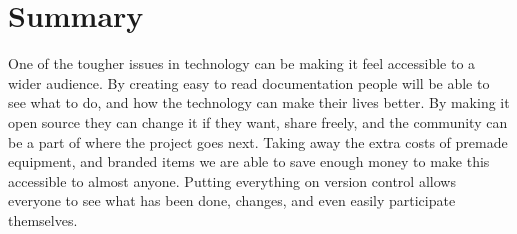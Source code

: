 \documentclass[12pt]{article}
\begin{document}
\section*{Summary}
One of the tougher issues in technology can be making it feel accessible to a wider audience.  By creating easy to read documentation people will be able to see what to do, and how the technology can make their lives better.  By making it open source they can change it if they want, share freely, and the community can be a part of where the project goes next. Taking away the extra costs of premade equipment, and branded items we are able to save enough money to make this accessible to almost anyone. Putting everything on version control allows everyone to see what has been done, changes, and even easily participate themselves. 
\end{document}
